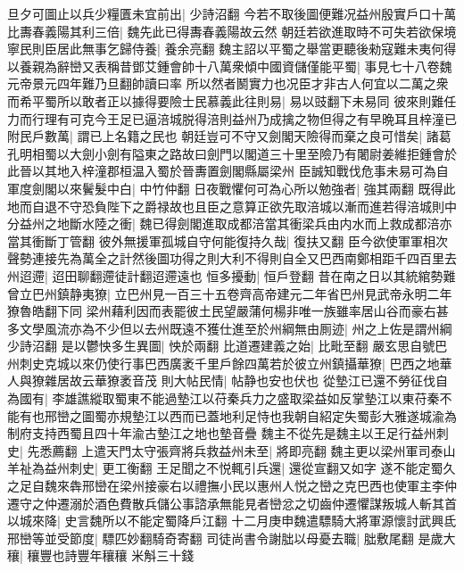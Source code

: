 旦夕可圖止以兵少糧匱未宜前出|{
	少詩沼翻}
今若不取後圖便難况益州殷實戶口十萬比夀春義陽其利三倍|{
	魏先此已得夀春義陽故云然}
朝廷若欲進取時不可失若欲保境寧民則臣居此無事乞歸侍養|{
	養余亮翻}
魏主詔以平蜀之舉當更聽後勑寇難未夷何得以養親為辭巒又表稱昔鄧艾鍾會帥十八萬衆傾中國資儲僅能平蜀|{
	事見七十八卷魏元帝景元四年難乃旦翻帥讀曰率}
所以然者鬭實力也况臣才非古人何宜以二萬之衆而希平蜀所以敢者正以據得要險士民慕義此往則易|{
	易以豉翻下未易同}
彼來則難任力而行理有可克今王足已逼涪城脱得涪則益州乃成擒之物但得之有早晩耳且梓潼已附民戶數萬|{
	謂已上名籍之民也}
朝廷豈可不守又劍閣天險得而棄之良可惜矣|{
	諸葛孔明相蜀以大劍小劍有隘東之路故曰劍門以閣道三十里至險乃有闍尉姜維拒鍾會於此晉以其地入梓潼郡桓温入蜀於晉夀置劍閣縣屬梁州}
臣誠知戰伐危事未易可為自軍度劍閣以來鬢髮中白|{
	中竹仲翻}
日夜戰懼何可為心所以勉強者|{
	強其兩翻}
既得此地而自退不守恐負陛下之爵禄故也且臣之意算正欲先取涪城以漸而進若得涪城則中分益州之地斷水陸之衝|{
	魏已得劍閣進取成都涪當其衝梁兵由内水而上救成都涪亦當其衝斷丁管翻}
彼外無援軍孤城自守何能復持久哉|{
	復扶又翻}
臣今欲使軍軍相次聲勢連接先為萬全之計然後圖功得之則大利不得則自全又巴西南鄭相距千四百里去州迢遰|{
	迢田聊翻遰徒計翻迢遰遠也}
恒多擾動|{
	恒戶登翻}
昔在南之日以其統綰勢難曾立巴州鎮静夷獠|{
	立巴州見一百三十五卷齊高帝建元二年省巴州見武帝永明二年獠魯皓翻下同}
梁州藉利因而表罷彼土民望嚴蒲何楊非唯一族雖率居山谷而豪右甚多文學風流亦為不少但以去州既遠不獲仕進至於州綱無由厠迹|{
	州之上佐是謂州綱少詩沼翻}
是以鬱怏多生異圖|{
	怏於兩翻}
比道遷建義之始|{
	比毗至翻}
嚴玄思自號巴州刺史克城以來仍使行事巴西廣袤千里戶餘四萬若於彼立州鎮攝華獠|{
	巴西之地華人與獠雜居故云華獠袤音茂}
則大帖民情|{
	帖静也安也伏也}
從墊江已還不勞征伐自為國有|{
	李雄譙縱取蜀東不能過墊江以苻秦兵力之盛取梁益如反掌墊江以東苻秦不能有也邢巒之圖蜀亦規墊江以西而已蓋地利足恃也我朝自紹定失蜀彭大雅遂城渝為制府支持西蜀且四十年渝古墊江之地也墊音疊}
魏主不從先是魏主以王足行益州刺史|{
	先悉薦翻}
上遣天門太守張齊將兵救益州未至|{
	將即亮翻}
魏主更以梁州軍司泰山羊祉為益州刺史|{
	更工衡翻}
王足聞之不悦輒引兵還|{
	還從宣翻又如字}
遂不能定蜀久之足自魏來犇邢巒在梁州接豪右以禮撫小民以惠州人悦之巒之克巴西也使軍主李仲遷守之仲遷溺於酒色費散兵儲公事諮承無能見者巒忿之切齒仲遷懼謀叛城人斬其首以城來降|{
	史言魏所以不能定蜀降戶江翻}
十二月庚申魏遣驃騎大將軍源懷討武興氐邢巒等並受節度|{
	驃匹妙翻騎奇寄翻}
司徒尚書令謝朏以母憂去職|{
	朏敷尾翻}
是歲大穰|{
	穰豐也詩豐年穰穰}
米斛三十錢

